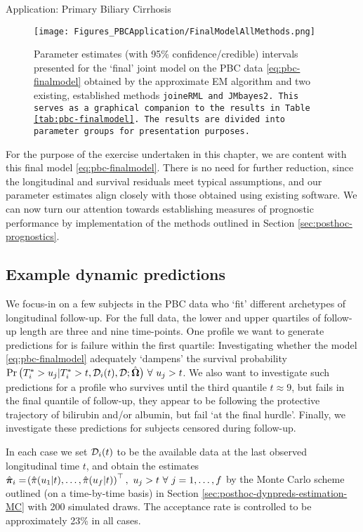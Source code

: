 \begin{chapter}{\label{cha:app-PBC}Application: Primary Biliary Cirrhosis}
  \begin{figure}[ht]
      \centering
      \texttt{[image: Figures\_PBCApplication/FinalModelAllMethods.png]}
      \caption{Parameter estimates (with 95\% confidence/credible) intervals presented for the `final' joint model on the PBC data \eqref{eq:pbc-finalmodel} obtained by the approximate EM algorithm and two existing, established methods \tt{joineRML} and \tt{JMbayes2}. This serves as a graphical companion to the results in Table \ref{tab:pbc-finalmodel}. The results are divided into parameter groups for presentation purposes.}
      \label{fig:pbc-finalmodel}
  \end{figure}
  
  For the purpose of the exercise undertaken in this chapter, we are content with this final model \eqref{eq:pbc-finalmodel}. There is no need for further reduction, since the longitudinal and survival residuals meet typical assumptions, and our parameter estimates align closely with those obtained using existing software. We can now turn our attention towards establishing measures of prognostic performance by implementation of the methods outlined in Section \ref{sec:posthoc-prognostics}.

  \subsection{Example dynamic predictions}\label{sec:pbc-final-model-dynpreds}
  We focus-in on a few subjects in the PBC data who `fit' different archetypes of longitudinal follow-up. For the full data, the lower and upper quartiles of follow-up length are three and nine time-points. One profile we want to generate predictions for is failure within the first quartile: Investigating whether the model \eqref{eq:pbc-finalmodel} adequately `dampens' the survival probability $\Pr\big( T_i^*> u_j|T_i^*>t,\mathcal{D}_i(t),\mathcal{D};\hbO\big)\ \forall\ u_j > t$. We also want to investigate such predictions for a profile who survives until the third quantile $t\approx9$, but fails in the final quantile of follow-up, \ie they appear to be following the protective trajectory of bilirubin and/or albumin, but fail `at the final hurdle'. Finally, we investigate these predictions for subjects censored during follow-up.
  
  In each case we set $\mathcal{D}_i\!\left( t\right)$ to be the available data at the last observed longitudinal time $t$, and obtain the estimates $\hat{\bm{\pi}}_i=\lb\hat{\pi}(u_1|t),\dots,\hat{\pi}(u_f|t)\rb^\top,\ u_j>t\ \forall\ j=1,\dots,f$ by the Monte Carlo scheme outlined (on a time-by-time basis) in Section \ref{sec:posthoc-dynpreds-estimation-MC} with 200 simulated draws. The acceptance rate is controlled to be approximately 23\% in all cases.


\end{chapter}
